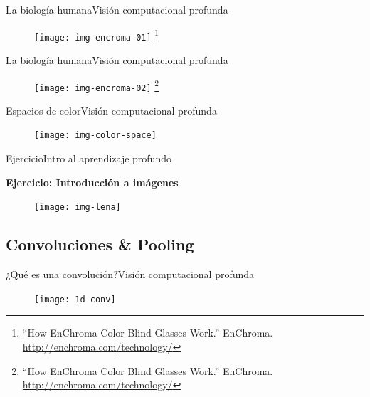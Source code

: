 \documentclass[10pt,border=3pt,tikz]{beamer}
\begin{document}
    \begin{frame}{La biología humana}{Visión computacional profunda}
        \begin{figure}
            \centering
            \texttt{[image: img-encroma-01]}
            \let\thefootnote\relax\footnote{{\tiny “How EnChroma Color Blind Glasses Work.” EnChroma. \url{http://enchroma.com/technology/}}}
        \end{figure}
    \end{frame}
    
    \begin{frame}{La biología humana}{Visión computacional profunda}
        \begin{figure}
            \centering
            \texttt{[image: img-encroma-02]}
            \let\thefootnote\relax\footnote{{\tiny “How EnChroma Color Blind Glasses Work.” EnChroma. \url{http://enchroma.com/technology/}}}
        \end{figure}
    \end{frame}
    
    \begin{frame}{Espacios de color}{Visión computacional profunda}
        \begin{figure}
            \centering
            \texttt{[image: img-color-space]}
        \end{figure}
    \end{frame}
    
    \begin{frame}{Ejercicio}{Intro al aprendizaje profundo}
        \begin{center}
            {\Large \textbf{Ejercicio: Introducción a imágenes}}
        \end{center}
        \begin{figure}
            \centering
            \texttt{[image: img-lena]}
        \end{figure}
    \end{frame}
    
    \subsection{Convoluciones \& Pooling}
    \begin{frame}{¿Qué es una convolución?}{Visión computacional profunda}
        \begin{figure}
            \centering
            \texttt{[image: 1d-conv]}
        \end{figure}
    \end{frame}
    
\end{document}
